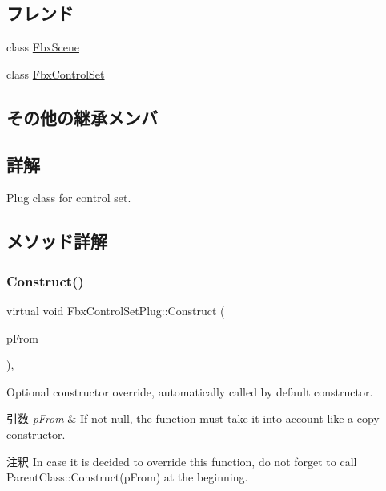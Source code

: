 \subsection*{フレンド}
\begin{DoxyCompactItemize}
\item 
class \hyperlink{class_fbx_control_set_plug_abcc807c3523609e1c734764de626facc}{Fbx\+Scene}
\item 
class \hyperlink{class_fbx_control_set_plug_abb7258e30f1cd7963b2a91006c383c19}{Fbx\+Control\+Set}
\end{DoxyCompactItemize}
\subsection*{その他の継承メンバ}


\subsection{詳解}
Plug class for control set. 

\subsection{メソッド詳解}
\mbox{\label{class_fbx_control_set_plug_a238ea564b568be5fadd03981570c2e47}} 
\subsubsection{\texorpdfstring{Construct()}{Construct()}}
{\footnotesize\ttfamily virtual void Fbx\+Control\+Set\+Plug\+::\+Construct (\begin{DoxyParamCaption}\item[{const \hyperlink{class_fbx_object}{Fbx\+Object} $\ast$}]{p\+From }\end{DoxyParamCaption})\hspace{0.3cm}{\ttfamily [protected]}, {\ttfamily [virtual]}}

Optional constructor override, automatically called by default constructor. 
\begin{DoxyParams}{引数}
{\em p\+From} & If not null, the function must take it into account like a copy constructor. \\
\hline
\end{DoxyParams}
\begin{DoxyRemark}{注釈}
In case it is decided to override this function, do not forget to call Parent\+Class\+::\+Construct(p\+From) at the beginning. 
\end{DoxyRemark}



